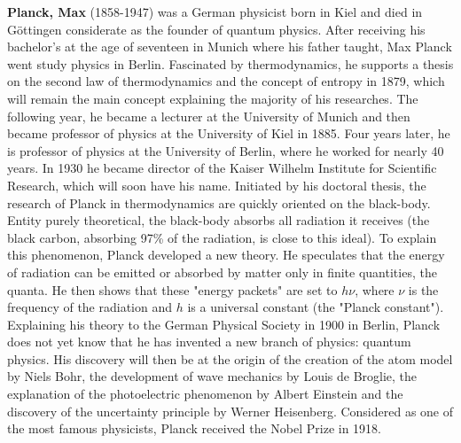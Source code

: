 \textbf{Planck, Max} (1858-1947) was a German physicist born in Kiel and died in Göttingen considerate as the founder of quantum physics. After receiving his bachelor's at the age of seventeen in Munich where his father taught, Max Planck went study physics in Berlin. Fascinated by thermodynamics, he supports a thesis on the second law of thermodynamics and the concept of entropy in 1879, which will remain the main concept explaining the majority of his researches. The following year, he became a lecturer at the University of Munich and then became professor of physics at the University of Kiel in 1885. Four years later, he is professor of physics at the University of Berlin, where he worked for nearly 40 years. In 1930 he became director of the Kaiser Wilhelm Institute for Scientific Research, which will soon have his name. Initiated by his doctoral thesis, the research of Planck in thermodynamics are quickly oriented on the black-body. Entity purely theoretical, the black-body absorbs all radiation it receives (the black carbon, absorbing 97\% of the radiation, is close to this ideal). To explain this phenomenon, Planck developed a new theory. He speculates that the energy of radiation can be emitted or absorbed by matter only in finite quantities, the quanta. He then shows that these "energy packets" are set to $h\nu$, where $\nu$ is the frequency of the radiation and $h$ is a universal constant (the "Planck constant"). Explaining his theory to the German Physical Society in 1900 in Berlin, Planck does not yet know that he has invented a new branch of physics: quantum physics. His discovery will then be at the origin of the creation of the atom model by Niels Bohr, the development of wave mechanics by Louis de Broglie, the explanation of the photoelectric phenomenon by Albert Einstein and the discovery of the uncertainty principle by Werner Heisenberg. Considered as one of the most famous physicists, Planck received the Nobel Prize in 1918.

